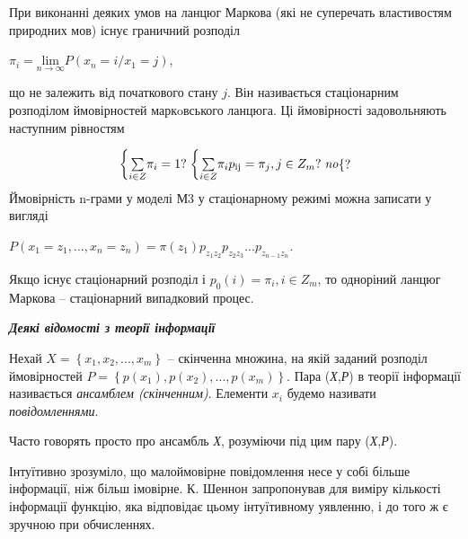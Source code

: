 \documentclass[a4paper]{article}
\newcounter{}
\newcommand\normalsubformula[1]{\text{\mathversion{normal}$#1$}}
\begin{document}
 При виконанні деяких умов на ланцюг Маркова (які не суперечать  властивостям
природних мов) існує граничний розподіл

{\centering
 ${\pi _{{i}}=\underset{{n\rightarrow \infty
}}{{\text{lim}}}P\left(x_{{n}}=i/x_{{1}}=j\right)}$,
\par}

що не залежить від початкового стану  ${j}$. Він називається стаціонарним
розподілом ймовірностей маркoвського ланцюга. Ці ймовірності задовольняють
наступним рівностям

\begin{equation*}
{\begin{matrix}\left\{\underset{{i\in Z}}{\sum }{\pi
_{{i}}}=1?\right.\left\{\underset{{i\in Z}}{\sum }{\pi
_{{i}}p_{{\normalsubformula{\text{ij}}}}}=\pi _{{j}},j\in
Z_{{m}}?\right.\mathit{no}\hfill\null \end{matrix}\{?}
\end{equation*}
Ймовірність n-грами у моделі М3 у стаціонарному режимі можна записати у вигляді


\bigskip

{\centering
 ${P\left(x_{{1}}=z_{{1}},\text{.}\text{.}\text{.},x_{{n}}=z_{{n}}\right)=\pi
(z_{{1}})p_{{z_{{1}}z_{{2}}}}p_{z_{{2}}z_{{3}}}{\text{.}\text{.}\text{.}p_{z_{{n-1}}z_{{n}}}}}$.
\par}


\bigskip

Якщо існує стаціонарний розподіл  і   ${p_{{0}}(i)=\pi _{{i}},i\in Z_{{m}}}$, то
одноріний ланцюг Маркова – стаціонарний випадковий процес.


\bigskip

{\centering\bfseries\itshape
Деякі відомості з теорії інформації
\par}

 Нехай  ${X=\left\{x_{{1}},x_{{2}},\text{.}\text{.}\text{.},x_{{m}}\right\}}$ –
скінченна множина, на якій заданий розподіл ймовірностей 
${P=\left\{p(x_{{1}}),p(x_{{2}}),\text{.}\text{.}\text{.},p(x_{{m}})\right\}}$.
Пара (\textit{Х},\textit{Р}) в теорії інформації називається \textit{ансамблем
(скінченним)}. Елементи  ${x_{{i}}}$ будемо називати \textit{повідомленнями}.

 Часто говорять просто про ансамбль \textit{Х}, розуміючи під цим пару
(\textit{Х},\textit{Р}).

 Інтуїтивно зрозуміло, що малоймовірне повідомлення несе у собі  більше
інформації, ніж більш імовірне. К. Шеннон запропонував для виміру кількості
інформації функцію, яка відповідає цьому інтуїтивному уявленню, і до того ж  є
зручною при обчисленнях.
\end{document}
